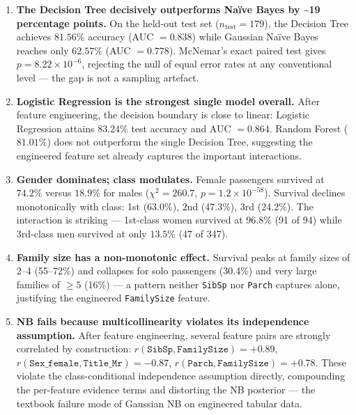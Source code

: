 \documentclass[11pt,a4paper]{article}
\begin{document}
\begin{enumerate}[leftmargin=1.3em,itemsep=4pt]

\item \textbf{The Decision Tree decisively outperforms Na\"ive Bayes by
\textasciitilde 19 percentage points.}
On the held-out test set ($n_\text{test}=179$), the Decision Tree achieves
$81.56\%$ accuracy (AUC $= 0.838$) while Gaussian Na\"ive Bayes reaches only
$62.57\%$ (AUC $= 0.778$). McNemar's exact paired test gives
$p = 8.22\times 10^{-6}$, rejecting the null of equal error rates at any
conventional level --- the gap is not a sampling artefact.

\item \textbf{Logistic Regression is the strongest single model overall.}
After feature engineering, the decision boundary is close to linear: Logistic
Regression attains $83.24\%$ test accuracy and AUC $= 0.864$. Random Forest
($81.01\%$) does not outperform the single Decision Tree, suggesting the
engineered feature set already captures the important interactions.

\item \textbf{Gender dominates; class modulates.}
Female passengers survived at $74.2\%$ versus $18.9\%$ for males
($\chi^2 = 260.7$, $p = 1.2\times 10^{-58}$). Survival declines monotonically
with class: 1st (63.0\%), 2nd (47.3\%), 3rd (24.2\%). The interaction is
striking --- 1st-class women survived at $96.8\%$ (91 of 94) while 3rd-class
men survived at only $13.5\%$ (47 of 347).

\item \textbf{Family size has a non-monotonic effect.}
Survival peaks at family sizes of 2--4 (55--72\%) and collapses for solo
passengers (30.4\%) and very large families of $\ge 5$ (16\%) --- a pattern
neither \texttt{SibSp} nor \texttt{Parch} captures alone, justifying the
engineered \texttt{FamilySize} feature.

\item \textbf{NB fails because multicollinearity violates its independence
assumption.}
After feature engineering, several feature pairs are strongly correlated by
construction: $r(\texttt{SibSp},\texttt{FamilySize}) = +0.89$,
$r(\texttt{Sex\_female},\texttt{Title\_Mr}) = -0.87$,
$r(\texttt{Parch},\texttt{FamilySize}) = +0.78$. These violate the
class-conditional independence assumption directly, compounding the per-feature
evidence terms and distorting the NB posterior --- the textbook failure mode of
Gaussian NB on engineered tabular data.

\end{enumerate}
\end{document}
